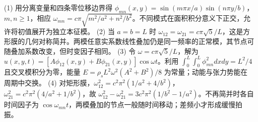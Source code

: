 (1) 用分离变量和四条零位移边界得 \(\phi_{mn}(x,y)=\sin(m\pi x/a)\sin(n\pi y/b)\)，\(m,n\ge1\)，相应 \(\omega_{mn}=c\pi\sqrt{m^2/a^2+n^2/b^2}\)。不同模式在面积积分意义下正交，允许将初值展开为独立本征模。
(2) 当 \(a=b=L\) 时 \(\omega_{12}=\omega_{21}=c\pi\sqrt5/L\)，这是方形膜的几何对称简并。两模任意实系数线性叠加仍是同一频率的正常模，其节点可随叠加系数改变，但时变因子相同。
(3) 令 \(\omega=c\pi\sqrt5/L\)，解为 \(u(x,y,t)=[A\phi_{12}(x,y)+B\phi_{21}(x,y)]\cos\omega t\)。利用 \(\int_0^L\!\int_0^L\phi_{mn}^2dxdy=L^2/4\) 且交叉模积分为零，能量 \(E=\rho_sL^2\omega^2(A^2+B^2)/8\) 为常量；动能与张力势能在周期中交换。
(4) 对矩形膜，\(\omega_{12}^2=c^2\pi^2(1/a^2+4/b^2)\)，\(\omega_{21}^2=c^2\pi^2(4/a^2+1/b^2)\)，故 \(\omega_{12}^2-\omega_{21}^2=3c^2\pi^2(1/b^2-1/a^2)\)。不再简并时各自时间因子为 \(\cos\omega_{mn}t\)，两模叠加的节点一般随时间移动；差频小才形成缓慢拍振。
